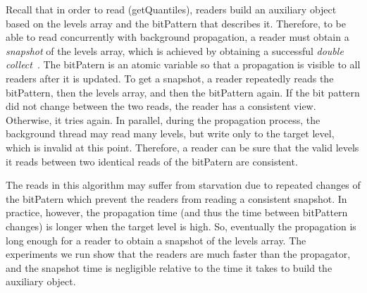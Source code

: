 Recall that in order to read (getQuantiles), readers build an
auxiliary object based on the levels array and the bitPattern
that describes it.
Therefore, to be able to read concurrently with
background propagation, a reader must obtain a \emph{snapshot} of the
levels array, which is achieved by obtaining 
 a successful  \emph{double}  \emph{collect}~\cite{}.
The bitPatern is an atomic variable so
that a propagation is visible to all readers after 
it is updated.
To get a snapshot, a reader repeatedly reads the bitPattern, then the levels array,
and then the bitPattern again.
If the bit pattern did not change between the two reads, the
reader has a consistent view.
Otherwise, it tries again.
In parallel, during the propagation process, the background
thread may read many levels, but write only to the target level,
which is invalid at this point.
Therefore, a reader can be sure that the valid levels it reads
between two identical reads of the bitPatern are consistent.

The reads in this algorithm may suffer from starvation due to repeated changes of the bitPatern which prevent the readers from reading a consistent snapshot.
In practice, however, the propagation time (and thus
the time between bitPattern changes) is longer when the target
level is high.
So, eventually the propagation is long enough for
a reader to obtain a snapshot of the levels array. 
The experiments we run show that the readers are 
much faster than the propagator, and the snapshot time is negligible relative to the time it takes to
build the auxiliary object.

